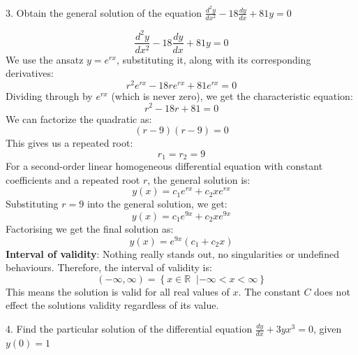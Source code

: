 \documentclass[a4paper, 12pt]{report}
\def\ni{green!60!black!40!white}
\begin{document}
    
    
    \newpage
    
    \begin{tcolorbox}[title={\color{black}\section{Q3}}, colback=white, colframe=\ni, boxrule=1mm, width=1\textwidth]
        3. Obtain the general solution of the equation \( \frac{d^2 y}{dx^2} - 18 \frac{dy}{dx} + 81y = 0 \) 
    \end{tcolorbox}
    
    

    \[ \frac{d^2 y}{dx^2} - 18 \frac{dy}{dx} + 81y = 0 \]    
    We use the ansatz \( y = e^{rx} \), substituting it, along with its corresponding derivatives:
    \[r^2 e^{rx} - 18r e^{rx} + 81 e^{rx} = 0\]
    Dividing through by \( e^{rx} \) (which is never zero), we get the characteristic equation:
    \[ r^2 - 18r + 81 = 0 \]
    We can factorize the quadratic as:
    \[(r - 9)(r - 9) = 0 \]
    This gives us a repeated root:
    \[ r_1 = r_2 = 9 \]
    For a second-order linear homogeneous differential equation with constant coefficients and a repeated root \( r \), the general solution is:
    \[ y(x) = c_1 e^{rx} + c_2 x e^{rx} \]
    Substituting \( r = 9 \) into the general solution, we get:
    \[ y(x) = c_1 e^{9x} + c_2 x e^{9x} \]
    Factorising we get the final solution as:
    \[ \boxed{y(x) = e^{9x} (c_1 + c_2 x)} \]
    \textbf{Interval of validity}: Nothing really stands out, no singularities or undefined behaviours. Therefore, the interval of validity is:
    \[(-\infty, \infty) = \left\{x \in \mathbb{R} \;\; | -\infty < x < \infty\right\}\]
    This means the solution is valid for all real values of \(x\). The constant \(C\) does not effect the solutions validity regardless of its value.
       
    \newpage
    
    \begin{tcolorbox}[title={\color{black}\section{Q4}}, colback=white, colframe=\ni, boxrule=1mm, width=1\textwidth]
        4. Find the particular solution of the differential equation \( \frac{dy}{dx} + 3y x^3 = 0 \), given \( y(0) = 1 \)
    \end{tcolorbox}
    
\end{document}
